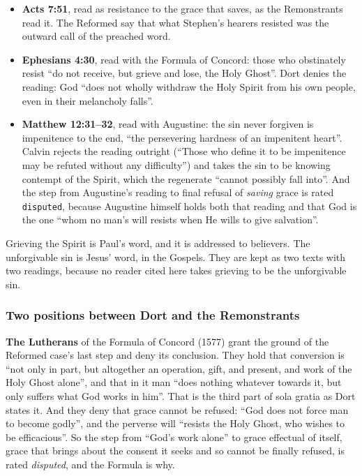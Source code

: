 \documentclass[11pt]{article}
\begin{document}
\begin{itemize}
  \item \textbf{Acts 7:51}, read as resistance to the grace that saves, as the Remonstrants read it. The Reformed say that what Stephen’s hearers resisted was the outward call of the preached word.
  \item \textbf{Ephesians 4:30}, read with the Formula of Concord: those who obstinately resist “do not receive, but grieve and lose, the Holy Ghost”. Dort denies the reading: God “does not wholly withdraw the Holy Spirit from his own people, even in their melancholy falls”.
  \item \textbf{Matthew 12:31–32}, read with Augustine: the sin never forgiven is impenitence to the end, “the persevering hardness of an impenitent heart”. Calvin rejects the reading outright (“Those who define it to be impenitence may be refuted without any difficulty”) and takes the sin to be knowing contempt of the Spirit, which the regenerate “cannot possibly fall into”. And the step from Augustine’s reading to final refusal of \emph{saving} grace is rated \texttt{disputed}, because Augustine himself holds both that reading and that God is the one “whom no man’s will resists when He wills to give salvation”.
\end{itemize}
Grieving the Spirit is Paul’s word, and it is addressed to believers. The unforgivable sin is Jesus’ word, in the Gospels. They are kept as two texts with two readings, because no reader cited here takes grieving to be the unforgivable sin.

\subsubsection*{Two positions between Dort and the Remonstrants}
\textbf{The Lutherans} of the Formula of Concord (1577) grant the ground of the Reformed case’s last step and deny its conclusion. They hold that conversion is “not only in part, but altogether an operation, gift, and present, and work of the Holy Ghost alone”, and that in it man “does nothing whatever towards it, but only suffers what God works in him”. That is the third part of sola gratia as Dort states it. And they deny that grace cannot be refused: “God does not force man to become godly”, and the perverse will “resists the Holy Ghost, who wishes to be efficacious”. So the step from “God’s work alone” to grace effectual of itself, grace that brings about the consent it seeks and so cannot be finally refused, is rated \emph{disputed}, and the Formula is why.
\end{document}
